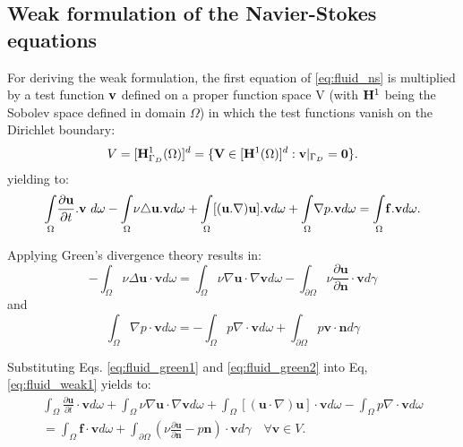 \subsection{Weak formulation of the Navier-Stokes equations} \label{sec:fluid_weak}

For deriving the weak formulation, the first equation of \ref{eq:fluid_ns} is multiplied by a test function $\bf v$ defined on a proper function space V (with ${\bf H}^{1}$ being the Sobolev space defined in domain $\Omega$) in which the test functions vanish on the Dirichlet boundary:
\begin{equation} \label{eq:fluid_space_v}
V = [{\bf H}^{1}_{\Gamma_{D}}(\Omega)]^{d} = \lbrace{\bf V} \in [{\bf H}^{1}(\Omega)]^{d} : {\bf v}|_{\Gamma_{D}} = {\bf 0}\rbrace.
\end{equation}
yielding to:
\begin{equation} \label{eq:fluid_weak1}
{\mathop{\int}_{\Omega}} {\partial {\bf u} \over \partial t}.{\bf v}\ d\omega- {\mathop{\int}_{\Omega}}\nu\triangle{\bf u.v}d\omega+ {\mathop{\int}_{\Omega}}[({\bf u.\nabla){\bf u].{\bf v}}}d\omega+ {\mathop{\int}_{\Omega}}\nabla p.{\bf v}d\omega= {\mathop{\int}_{\Omega}}{\bf f. v}d\omega.
\end{equation}

\noindent Applying Green's divergence theory results in:
\begin{equation} \label{eq:fluid_green1}
-\int_{\Omega} \nu \Delta \mathbf{u} \cdot \mathbf{v} d \omega=\int_{\Omega} \nu \nabla \mathbf{u} \cdot \nabla \mathbf{v} d \omega-\int_{\partial \Omega} \nu \frac{\partial \mathbf{u}}{\partial \mathbf{n}} \cdot \mathbf{v} d \gamma
\end{equation}
and
\begin{equation} \label{eq:fluid_green2}
\int_{\Omega} \nabla p \cdot \mathbf{v} d \omega=-\int_{\Omega} p \nabla\cdot \mathbf{v} d \omega+\int_{\partial \Omega} p \mathbf{v} \cdot \mathbf{n} d \gamma
\end{equation}

\noindent Substituting Eqs. \ref{eq:fluid_green1} and \ref{eq:fluid_green2} into Eq, \ref{eq:fluid_weak1} yields to:
\begin{equation} \label{eq:fluid_ns_weak}
\begin{array}{r}
\displaystyle\int_{\Omega} \frac{\partial \mathbf{u}}{\partial t} \cdot \mathbf{v} d \omega+\int_{\Omega} \nu \nabla \mathbf{u} \cdot \nabla \mathbf{v} d \omega+\int_{\Omega}[(\mathbf{u} \cdot \nabla) \mathbf{u}] \cdot \mathbf{v} d \omega-\int_{\Omega} p \nabla\cdot \mathbf{v} d \omega \\
\displaystyle=\int_{\Omega} \mathbf{f} \cdot \mathbf{v} d \omega+\int_{\partial \Omega}\left(\nu \frac{\partial \mathbf{u}}{\partial \mathbf{n}}-p \mathbf{n}\right) \cdot \mathbf{v} d \gamma \quad \forall \mathbf{v} \in V .
\end{array}
\end{equation}

